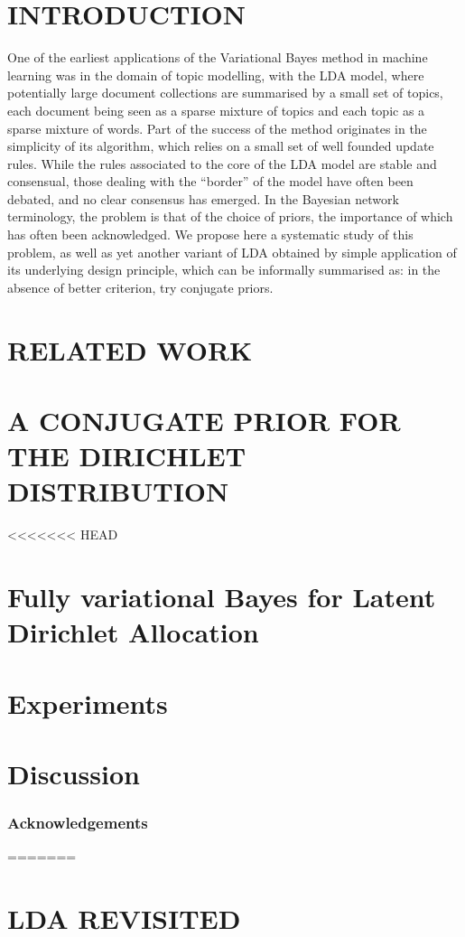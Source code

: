 \documentclass[twoside]{article}
\begin{document}
\section{INTRODUCTION}
One of the earliest applications of the Variational Bayes method in machine learning was in the domain of topic modelling, with the LDA model, where potentially large document collections are summarised by a small set of topics, each document being seen as a sparse mixture of topics and each topic as a sparse mixture of words. Part of the success of the method originates in the simplicity of its algorithm, which relies on a small set of well founded update rules. While the rules associated to the core of the LDA model are stable and consensual, those dealing with the ``border'' of the model have often been debated, and no clear consensus has emerged. In the Bayesian network terminology, the problem is that of the choice of priors, the importance of which has often been acknowledged. We propose here a systematic study of this problem, as well as yet another variant of LDA obtained by simple application of its underlying design principle, which can be informally summarised as: in the absence of better criterion, try conjugate priors.
\section{RELATED WORK}

\section{A CONJUGATE PRIOR FOR THE DIRICHLET DISTRIBUTION}
\label{sec:huntingsnark}

<<<<<<< HEAD
\section{Fully variational Bayes for Latent Dirichlet Allocation}
\section{Experiments}

\section{Discussion}

\subsubsection*{Acknowledgements}
=======
\section{LDA REVISITED}
\label{sec:ldarevisited}

\end{document}

